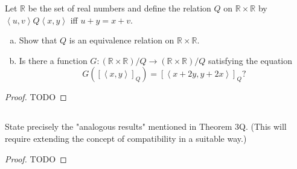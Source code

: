 \documentclass{report}
\begin{document}
Let $\mathbb{R}$ be the set of real numbers and define the relation $Q$ on
  $\mathbb{R} \times \mathbb{R}$ by $\left< u, v \right>Q \left< x, y \right>$
  iff $u + y = x + v$.

\begin{enumerate}[(a)]
  \item Show that $Q$ is an equivalence relation on
    $\mathbb{R} \times \mathbb{R}$.
  \item Is there a function $G \colon (\mathbb{R} \times \mathbb{R}) / Q
    \rightarrow (\mathbb{R} \times \mathbb{R}) / Q$ satisfying the equation
    $$G([\left< x, y \right>]_Q) = [\left< x + 2y, y + 2x \right>]_Q?$$

\end{enumerate}

\begin{proof}

  TODO

\end{proof}

\subsection{}%
\label{sub:exercise-3.42}

State precisely the "analogous results" mentioned in Theorem 3Q.
(This will require extending the concept of compatibility in a suitable way.)

\begin{proof}

  TODO

\end{proof}
\end{document}
